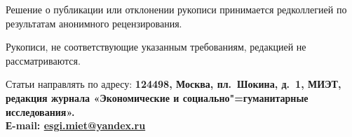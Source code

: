 \begin{multicols}{2}
Решение о публикации или отклонении рукописи принимается редколлегией
по результатам анонимного рецензирования.

Рукописи, не соответствующие указанным требованиям, редакцией не рассматриваются.

\begin{flushleft}
    Статьи направлять по адресу: \bfseries 124498,
    Москва, пл. Шокина, д. 1, МИЭТ,
    редакция журнала «Экономические
    и социально"=гуманитарные исследования».\\
    Е-mail: \href{mailto:esgi.miet@yandex.ru}{esgi.miet@yandex.ru} \par
\end{flushleft}

\end{multicols}

\label{authors:end}